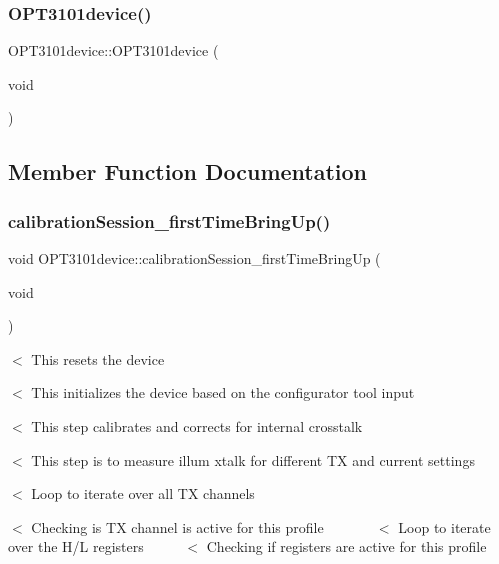 \subsubsection{\texorpdfstring{O\+P\+T3101device()}{OPT3101device()}}
{\footnotesize\ttfamily O\+P\+T3101device\+::\+O\+P\+T3101device (\begin{DoxyParamCaption}\item[{void}]{ }\end{DoxyParamCaption})}



\subsection{Member Function Documentation}
\mbox{\label{class_o_p_t3101device_af2dc559857f5d8d209b9f10c3f1cd758}} 
\subsubsection{\texorpdfstring{calibration\+Session\+\_\+first\+Time\+Bring\+Up()}{calibrationSession\_firstTimeBringUp()}}
{\footnotesize\ttfamily void O\+P\+T3101device\+::calibration\+Session\+\_\+first\+Time\+Bring\+Up (\begin{DoxyParamCaption}\item[{void}]{ }\end{DoxyParamCaption})}

$<$ This resets the device

$<$ This initializes the device based on the configurator tool input

$<$ This step calibrates and corrects for internal crosstalk

$<$ This step is to measure illum xtalk for different TX and current settings

$<$ Loop to iterate over all TX channels

$<$ Checking is TX channel is active for this profile ~\newline
~\newline
~\newline
~\newline
 $<$ Loop to iterate over the H/L registers ~\newline
~\newline
~\newline
 $<$ Checking if registers are active for this profile

